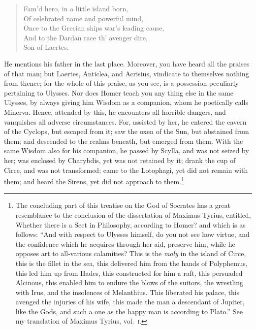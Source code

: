 \documentclass[12pt]{article}
\begin{document}
\begin{verse}
Fam'd hero, in a little island born,\\
Of celebrated name and powerful mind,\\
Once to the Grecian ships war's leading cause,\\
And to the Dardan race th' avenger dire,\\
Son of Laertes.
\end{verse}

\noindent He mentions his father in the last place. Moreover, you have heard
all the praises of that man; but Laertes, Anticlea, and Acrisius, vindicate
to themselves nothing from thence; for the whole of this praise, as you see, is
a possession peculiarly pertaining to Ulysses. Nor does Homer teach you any
thing else in the same Ulysses, by always giving him Wisdom as a companion,
whom he poetically calls Minerva. Hence, attended by this, he encounters all
horrible dangers, and vanquishes all adverse circumstances. For, assisted by
her, he entered the cavern of the Cyclops, but escaped from it; saw the oxen of
the Sun, but abstained from them; and descended to the realms beneath, but
emerged from them. With the same Wisdom also for his companion, he passed by
Scylla, and was not seized by her; was enclosed by Charybdis, yet was not
retained by it; drank the cup of Circe, and was not transformed; came to the
Lotophagi, yet did not remain with them; and heard the Sirens, yet did not
approach to them.\footnote{The concluding part of this treatise on the God of
Socrates has a great resemblance to the conclusion of the dissertation of
Maximus Tyrius, entitled, Whether there is a Sect in Philosophy,
according to Homer? and which is as follows: ``And with respect to Ulysses
himself, do you not see how virtue, and the confidence which he acquires
through her aid, preserve him, while he opposes art to all-various calamities?
This is the \textit{moly} in the island of Circe, this is the fillet in the
sea, this delivered him from the hands of Polyphemus, this led him up from
Hades, this constructed for him a raft, this persuaded Alcinous, this enabled
him to endure the blows of the suitors, the wrestling with Irus, and the
insolences of Melanthius. This liberated his palace, this avenged the injuries
of his wife, this made the man a descendant of Jupiter, like the Gods, and such
a one as the happy man is according to Plato.'' See my translation of Maximus
Tyrius, vol.~\textsc{i}.}
\end{document}
